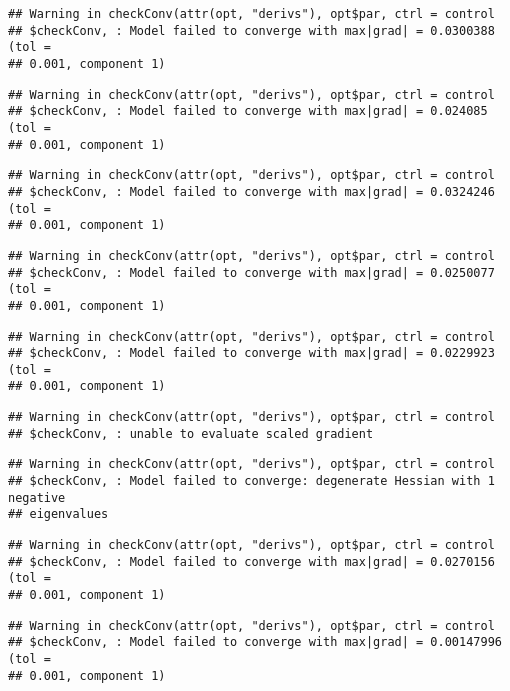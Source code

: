 \documentclass[]{article}
\begin{document}
\begin{verbatim}
## Warning in checkConv(attr(opt, "derivs"), opt$par, ctrl = control
## $checkConv, : Model failed to converge with max|grad| = 0.0300388 (tol =
## 0.001, component 1)
\end{verbatim}

\begin{verbatim}
## Warning in checkConv(attr(opt, "derivs"), opt$par, ctrl = control
## $checkConv, : Model failed to converge with max|grad| = 0.024085 (tol =
## 0.001, component 1)
\end{verbatim}

\begin{verbatim}
## Warning in checkConv(attr(opt, "derivs"), opt$par, ctrl = control
## $checkConv, : Model failed to converge with max|grad| = 0.0324246 (tol =
## 0.001, component 1)
\end{verbatim}

\begin{verbatim}
## Warning in checkConv(attr(opt, "derivs"), opt$par, ctrl = control
## $checkConv, : Model failed to converge with max|grad| = 0.0250077 (tol =
## 0.001, component 1)
\end{verbatim}

\begin{verbatim}
## Warning in checkConv(attr(opt, "derivs"), opt$par, ctrl = control
## $checkConv, : Model failed to converge with max|grad| = 0.0229923 (tol =
## 0.001, component 1)
\end{verbatim}

\begin{verbatim}
## Warning in checkConv(attr(opt, "derivs"), opt$par, ctrl = control
## $checkConv, : unable to evaluate scaled gradient
\end{verbatim}

\begin{verbatim}
## Warning in checkConv(attr(opt, "derivs"), opt$par, ctrl = control
## $checkConv, : Model failed to converge: degenerate Hessian with 1 negative
## eigenvalues
\end{verbatim}

\begin{verbatim}
## Warning in checkConv(attr(opt, "derivs"), opt$par, ctrl = control
## $checkConv, : Model failed to converge with max|grad| = 0.0270156 (tol =
## 0.001, component 1)
\end{verbatim}

\begin{verbatim}
## Warning in checkConv(attr(opt, "derivs"), opt$par, ctrl = control
## $checkConv, : Model failed to converge with max|grad| = 0.00147996 (tol =
## 0.001, component 1)
\end{verbatim}
\end{document}
